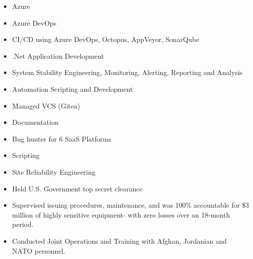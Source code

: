 \documentclass[10pt,a4paper,ragged2e,withhyper]{altacv}
\begin{document}


\makecvheader


\begin{paracol}{2}

\begin{itemize}
\item Azure
\item Azure DevOps
\item CI/CD using Azure DevOps, Octopus, AppVeyor, SonarQube
\item .Net Application Development
\item System Stability Engineering, Monitoring, Alerting, Reporting and Analysis
\item Automation Scripting and Development
\item Managed VCS (Gitea)
\item Documentation
\end{itemize}

\divider

\begin{itemize}
\item Bug hunter for 6 SaaS Platforms
\item Scripting
\item Site Reliability Engineering
\end{itemize}

\divider

\begin{itemize}
\item Held U.S. Government top secret clearance
\item Supervised issuing procedures, maintenance, and was 100\% accountable for \$3 million of highly sensitive equipment- with zero losses over an 18-month period.
\item Conducted Joint Operations and Training with Afghan, Jordanian and NATO personnel. 
\end{itemize}


\end{paracol}
\end{document}

